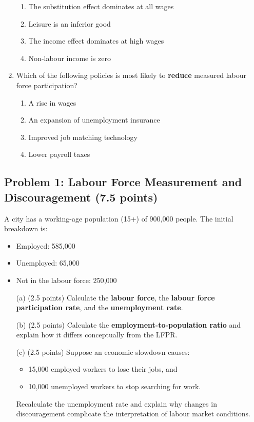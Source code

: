 \documentclass[11pt]{article}
\begin{document}
\begin{enumerate}
\begin{enumerate}
\item The substitution effect dominates at all wages  
\item Leisure is an inferior good  
\item The income effect dominates at high wages  
\item Non-labour income is zero  
\end{enumerate}


\newpage
\item Which of the following policies is most likely to \textbf{reduce} measured labour force participation?

\begin{enumerate}
\item A rise in wages  
\item An expansion of unemployment insurance  
\item Improved job matching technology  
\item Lower payroll taxes  
\end{enumerate}
\end{enumerate}



\subsection*{Problem 1: Labour Force Measurement and Discouragement (7.5 points)}

A city has a working-age population (15+) of 900{,}000 people. The initial breakdown is:

\begin{itemize}
\item Employed: 585{,}000  
\item Unemployed: 65{,}000  
\item Not in the labour force: 250{,}000  
\end{itemize}

\begin{enumerate}
\item[(a)] (2.5 points)  
Calculate the \textbf{labour force}, the \textbf{labour force participation rate}, and the \textbf{unemployment rate}.

\item[(b)] (2.5 points)  
Calculate the \textbf{employment-to-population ratio} and explain how it differs conceptually from the LFPR.

\item[(c)] (2.5 points)  
Suppose an economic slowdown causes:
\begin{itemize}
\item 15{,}000 employed workers to lose their jobs, and  
\item 10{,}000 unemployed workers to stop searching for work.
\end{itemize}

Recalculate the unemployment rate and explain why changes in discouragement complicate the interpretation of labour market conditions.
\end{enumerate}
\end{document}
